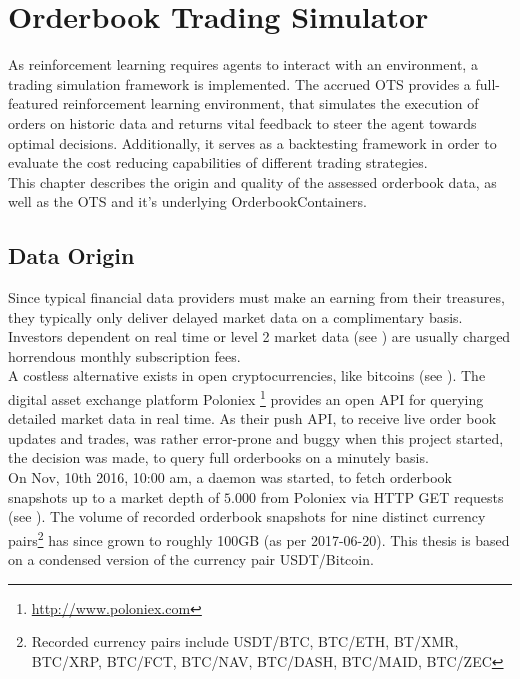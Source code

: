 \chapter{Orderbook Trading Simulator}
\label{chap:simulator}
As reinforcement learning requires agents to interact with an environment, a trading simulation framework is implemented. The accrued \acf{OTS} provides a full-featured reinforcement learning environment, that simulates the execution of orders on historic data and returns vital feedback to steer the agent towards optimal decisions. Additionally, it serves as a backtesting framework in order to evaluate the cost reducing capabilities of different trading strategies.\\

This chapter describes the origin and quality of the assessed orderbook data, as well as the \ac{OTS} and it's underlying OrderbookContainers.


\section{Data Origin}
\label{chap:dataorigin}
Since typical financial data providers must make an earning from their treasures, they typically only deliver delayed market data on a complimentary basis. Investors dependent on real time or level 2 market data (see ) are usually charged horrendous monthly subscription fees.\\

A costless alternative exists in open cryptocurrencies, like bitcoins (see ). The digital asset exchange platform Poloniex \footnote{\url{http://www.poloniex.com}} provides an open API for querying detailed market data in real time. As their push API, to receive live order book updates and trades, was rather error-prone and buggy when this project started, the decision was made, to query full orderbooks on a minutely basis.\\

On Nov, 10th 2016, 10:00 am, a daemon was started, to fetch orderbook snapshots up to a market depth of $5.000$ from Poloniex via HTTP GET requests (see ). The volume of recorded orderbook snapshots for nine distinct currency pairs\footnote{Recorded currency pairs include USDT/BTC, BTC/ETH, BT/XMR, BTC/XRP, BTC/FCT, BTC/NAV, BTC/DASH, BTC/MAID, BTC/ZEC} has since grown to roughly 100GB (as per 2017-06-20). This thesis is based on a condensed version of the currency pair USDT/Bitcoin.

